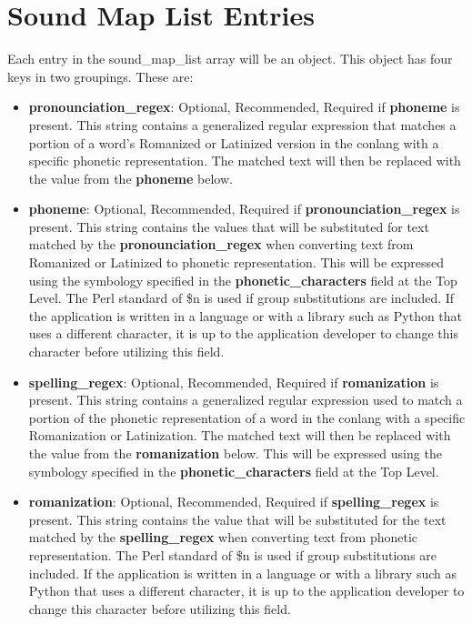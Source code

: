\chapter{Sound Map List Entries}
Each entry in the sound\_map\_list array will be an object.  This object has four keys in two groupings.  These are:
\begin{itemize}
	\item \textbf{pronounciation\_regex}: Optional, Recommended, Required if \textbf{phoneme} is present.  This string contains a generalized regular expression that matches a portion of a word's Romanized or Latinized version in the conlang with a specific phonetic representation.  The matched text will then be replaced with the value from the \textbf{phoneme} below.
	\item \textbf{phoneme}: Optional, Recommended, Required if \textbf{pronounciation\_regex} is present.  This string contains the values that will be substituted for text matched by the \textbf{pronounciation\_regex} when converting text from Romanized or Latinized to phonetic representation.  This will be expressed using the symbology specified in the \textbf{phonetic\_characters} field at the Top Level.  The Perl standard of \$n is used if group substitutions are included.  If the application is written in a language or with a library such as Python that uses a different character, it is up to the application developer to change this character before utilizing this field.
	\item \textbf{spelling\_regex}: Optional, Recommended, Required if \textbf{romanization} is present.  This string contains a generalized regular expression used to match a portion of the phonetic representation of a word in the conlang with a specific Romanization or Latinization.  The matched text will then be replaced with the value from the \textbf{romanization} below.  This will be expressed using the symbology specified in the \textbf{phonetic\_characters} field at the Top Level.
	\item \textbf{romanization}: Optional, Recommended, Required if \textbf{spelling\_regex} is present.  This string contains the value that will be substituted for the text matched by the \textbf{spelling\_regex} when converting text from phonetic representation.  The Perl standard of \$n is used if group substitutions are included.  If the application is written in a language or with a library such as Python that uses a different character, it is up to the application developer to change this character before utilizing this field.
\end{itemize}

